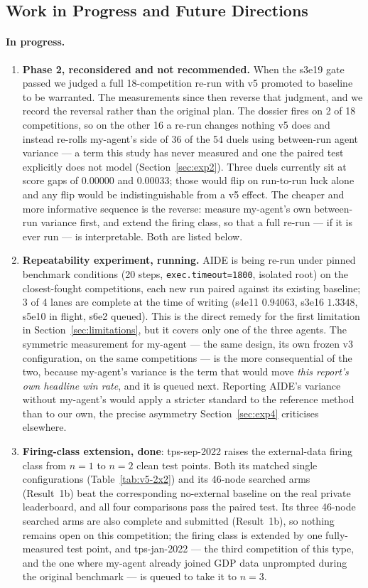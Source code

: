 \documentclass[11pt,a4paper]{article}
\begin{document}
\subsection{Work in Progress and Future Directions}
\label{sec:future}

\paragraph{In progress.}
\begin{enumerate}[leftmargin=*]
  \item \textbf{Phase 2, reconsidered and not recommended.} When the s3e19 gate passed we judged a full 18-competition re-run with v5 promoted to baseline to be warranted. The measurements since then reverse that judgment, and we record the reversal rather than the original plan. The dossier fires on 2 of 18 competitions, so on the other 16 a re-run changes nothing v5 does and instead re-rolls my-agent's side of 36 of the 54 duels using between-run agent variance --- a term this study has never measured and one the paired test explicitly does not model (Section~\ref{sec:exp2}). Three duels currently sit at score gaps of $0.00000$ and $0.00033$; those would flip on run-to-run luck alone and any flip would be indistinguishable from a v5 effect. The cheaper and more informative sequence is the reverse: measure my-agent's own between-run variance first, and extend the firing class, so that a full re-run --- if it is ever run --- is interpretable. Both are listed below.
  \item \textbf{Repeatability experiment, running.} AIDE is being re-run under pinned benchmark conditions (20 steps, \texttt{exec.timeout=1800}, isolated root) on the closest-fought competitions, each new run paired against its existing baseline; 3 of 4 lanes are complete at the time of writing (s4e11 $0.94063$, s3e16 $1.3348$, s5e10 in flight, s6e2 queued). This is the direct remedy for the first limitation in Section~\ref{sec:limitations}, but it covers only one of the three agents. The symmetric measurement for my-agent --- the same design, its own frozen v3 configuration, on the same competitions --- is the more consequential of the two, because my-agent's variance is the term that would move \emph{this report's own headline win rate}, and it is queued next. Reporting AIDE's variance without my-agent's would apply a stricter standard to the reference method than to our own, the precise asymmetry Section~\ref{sec:exp4} criticises elsewhere.
  \item \textbf{Firing-class extension, done}: tps-sep-2022 raises the external-data firing class from $n{=}1$ to $n{=}2$ clean test points. Both its matched single configurations (Table~\ref{tab:v5-2x2}) and its 46-node searched arms (Result~1b) beat the corresponding no-external baseline on the real private leaderboard, and all four comparisons pass the paired test. Its three 46-node searched arms are also complete and submitted (Result~1b), so nothing remains open on this competition; the firing class is extended by one fully-measured test point, and tps-jan-2022 --- the third competition of this type, and the one where my-agent already joined GDP data unprompted during the original benchmark --- is queued to take it to $n{=}3$.

\end{enumerate}
\end{document}
